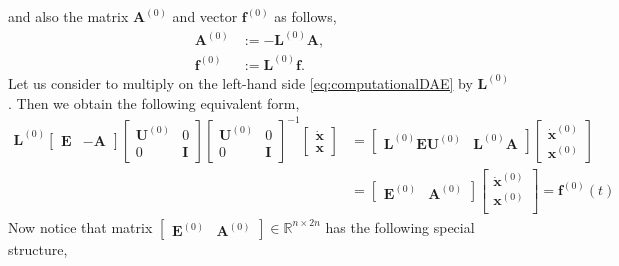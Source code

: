 		and also the matrix $\bm{A}^{(0)}$ and vector $\bm{f}^{(0)}$ as follows,
		\begin{subequations}
			\begin{align*}
				\bm{A}^{(0)} 	&:= -\bm{L}^{(0)}\bm{A},\\
				\bm{f}^{(0)} 	&:= \bm{L}^{(0)}\bm{f}.
			\end{align*}
		\end{subequations}
		Let us consider to multiply on the left-hand side \cref{eq:computationalDAE} by $\bm{L}^{(0)}$. Then we obtain the following equivalent form,
		\begin{equation*}
			\begin{split}
				\bm{L}^{(0)}
				\begin{bmatrix}
					\bm{E} & -\bm{A} 
				\end{bmatrix}
				\begin{bmatrix}
					\bm{U}^{(0)} & 0 \\
					0 & \bm{I} 
				\end{bmatrix}
				\begin{bmatrix}
					\bm{U}^{(0)} & 0 \\
					0 & \bm{I} 
				\end{bmatrix}^{-1}
				\begin{bmatrix}
					\dot{\bm{x}} \\
					\bm{x}
				\end{bmatrix}
				&= 
				\begin{bmatrix}
					\bm{L}^{(0)}\bm{EU}^{(0)} & \bm{L}^{(0)}\bm{A}
				\end{bmatrix}
				\begin{bmatrix}
					\dot{\bm{x}}^{(0)}\\
					\bm{x}^{(0)}
				\end{bmatrix} \\
				&= 
				\begin{bmatrix}
					\bm{E}^{(0)} & \bm{A}^{(0)}
				\end{bmatrix}
				\begin{bmatrix}
					\dot{\bm{x}}^{(0)} \\
					\bm{x}^{(0)} \\
				\end{bmatrix}
				=
				\bm{f}^{(0)}(t)
			\end{split}
		\end{equation*}
		Now notice that matrix $\begin{bmatrix}\bm{E}^{(0)} & \bm{A}^{(0)}\end{bmatrix}\in\mathbb{R}^{n\times 2n}$ has the following special structure, 
